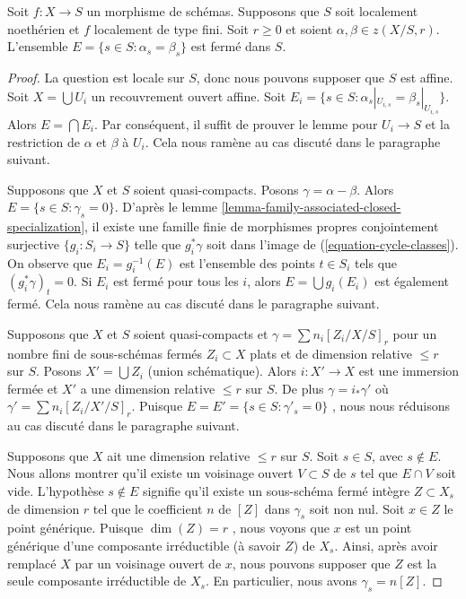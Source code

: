 \begin{lemma} 
\label{lemma-relative-cycles-equal} 
Soit  $f : X \to S$  un morphisme de schémas. Supposons que  $S$  soit localement noethérien
 et  $f$  localement de type fini. Soit  $r \geq 0$ et soient  
$\alpha, \beta \in z(X/S, r)$. L'ensemble  $E = \{s \in S : \alpha_s = \beta_s\}$
  est fermé dans  $S$. 
\end{lemma} 

\begin{proof} 
La question est locale sur  $S$, donc nous pouvons supposer que $S$  est affine. 
Soit  $X = \bigcup U_i$  un recouvrement ouvert affine. Soit 
$E_i = \{s \in S : \alpha_s|_{U_{i, s}} = \beta_s|_{U_{i, s}}\}$. 
Alors  $E = \bigcap E_i$. Par conséquent, il suffit de prouver le lemme pour  
$U_i \to S$  et la restriction de  $\alpha$  et  $\beta$  à $U_i$.
 Cela nous ramène au cas discuté dans le paragraphe suivant. 

\medskip\noindent
 Supposons que  $X$  et  $S$  soient quasi-compacts. 
Posons $\gamma = \alpha - \beta$. Alors  $E = \{s \in S : \gamma_s = 0\}$. 
D'après le lemme \ref{lemma-family-associated-closed-specialization}, il 
existe une famille finie de morphismes propres conjointement surjective  
$\{g_i : S_i \to S\}$  telle que  $g_i^*\gamma$  soit dans l'image
 de (\ref{equation-cycle-classes}). On observe que  $E_i = g_i^{-1}(E)$ est
 l'ensemble des points  $t \in S_i$  tels que  $(g_i^*\gamma)_t = 0$. 
Si  $E_i$  est fermé pour tous les  $i$, alors  $E = \bigcup g_i(E_i)$
  est également fermé. Cela nous ramène au cas discuté dans le paragraphe
 suivant. 

\medskip\noindent
 Supposons que  $X$  et  $S$  soient quasi-compacts et  $\gamma = \sum n_i[Z_i/X/S]_r$
 pour un nombre fini de sous-schémas fermés  $Z_i \subset X$
  plats et de dimension relative  $\leq r$  sur  $S$. 
Posons  $X' = \bigcup Z_i$  (union schématique). 
Alors  $i : X' \to X$  est une immersion fermée et  $X'$
  a une dimension relative  $\leq r$  sur  $S$. De plus  
$\gamma = i_*\gamma'$  où  $\gamma' = \sum n_i[Z_i/X'/S]_r$.
 Puisque  $E = E' = \{s \in S : \gamma'_s = 0\}$
 , nous nous réduisons au cas discuté dans le paragraphe suivant. 

\medskip\noindent
 Supposons que  $X$  ait une dimension relative  $\leq r$  sur $S$. 
Soit  $s \in S$, avec  $s \not \in E$. Nous allons montrer qu'il existe 
un voisinage ouvert  $V \subset S$  de  $s$  tel que  $E \cap V$  soit vide.
 L'hypothèse  $s \not \in E$  signifie qu'il existe un sous-schéma fermé
 intègre $Z \subset X_s$  de dimension  $r$  tel que le coefficient  
$n$  de $[Z]$  dans  $\gamma_s$  soit non nul. Soit  $x \in Z$  le point
 générique. Puisque  $\dim(Z) = r$ , nous voyons que  $x$  est un point 
générique d'une composante irréductible (à savoir  $Z$) de  $X_s$.
 Ainsi, après avoir remplacé  $X$  par un voisinage ouvert de  $x$,
 nous pouvons supposer que  $Z$  est la seule composante irréductible de  $X_s$.
 En particulier, nous avons  $\gamma_s = n[Z]$. 


\end{proof}
